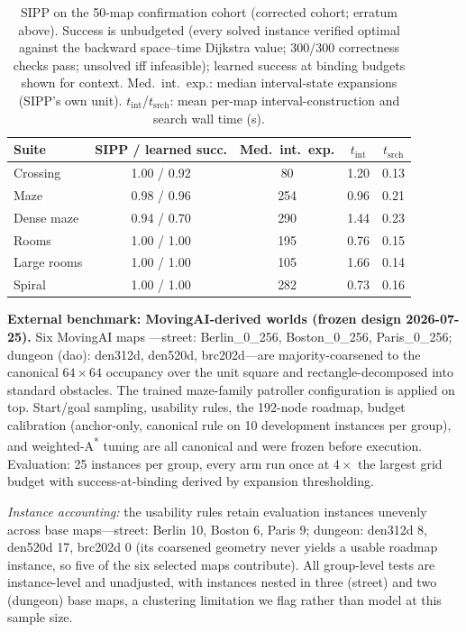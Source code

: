 \documentclass[letterpaper]{article} %
\begin{document}
\begin{table}[t]
\centering
\small
\setlength{\tabcolsep}{2.6pt}
\begin{tabular}{@{}lcccc@{}}
\toprule
Suite & SIPP / learned succ. & Med.\ int.\ exp. & $t_{\mathrm{int}}$ & $t_{\mathrm{srch}}$ \\
\midrule
Crossing & 1.00 / 0.92 & 80 & 1.20 & 0.13 \\
Maze & 0.98 / 0.96 & 254 & 0.96 & 0.21 \\
Dense maze & 0.94 / 0.70 & 290 & 1.44 & 0.23 \\
Rooms & 1.00 / 1.00 & 195 & 0.76 & 0.15 \\
Large rooms & 1.00 / 1.00 & 105 & 1.66 & 0.14 \\
Spiral & 1.00 / 1.00 & 282 & 0.73 & 0.16 \\
\bottomrule
\end{tabular}
\caption{SIPP on the 50-map confirmation cohort (corrected cohort; erratum above). Success is unbudgeted (every solved instance verified optimal against the backward space--time Dijkstra value; 300/300 correctness checks pass; unsolved iff infeasible); learned success at binding budgets shown for context. Med.\ int.\ exp.: median interval-state expansions (SIPP's own unit). $t_{\mathrm{int}}$/$t_{\mathrm{srch}}$: mean per-map interval-construction and search wall time (s).}
\label{tab:sipp}
\end{table}

\textbf{External benchmark: MovingAI-derived worlds (frozen design 2026-07-25).} Six MovingAI maps \citep{sturtevant2012movingai}---street: Berlin\_0\_256, Boston\_0\_256, Paris\_0\_256; dungeon (dao): den312d, den520d, brc202d---are majority-coarsened to the canonical $64{\times}64$ occupancy over the unit square and rectangle-decomposed into standard obstacles. The trained maze-family patroller configuration is applied on top. Start/goal sampling, usability rules, the 192-node roadmap, budget calibration (anchor-only, canonical rule on 10 development instances per group), and weighted-A\textsuperscript{*} tuning are all canonical and were frozen before execution. Evaluation: 25 instances per group, every arm run once at $4\times$ the largest grid budget with success-at-binding derived by expansion thresholding.

\emph{Instance accounting:} the usability rules retain evaluation instances unevenly across base maps---street: Berlin 10, Boston 6, Paris 9; dungeon: den312d 8, den520d 17, brc202d 0 (its coarsened geometry never yields a usable roadmap instance, so five of the six selected maps contribute). All group-level tests are instance-level and unadjusted, with instances nested in three (street) and two (dungeon) base maps, a clustering limitation we flag rather than model at this sample size.
\end{document}
